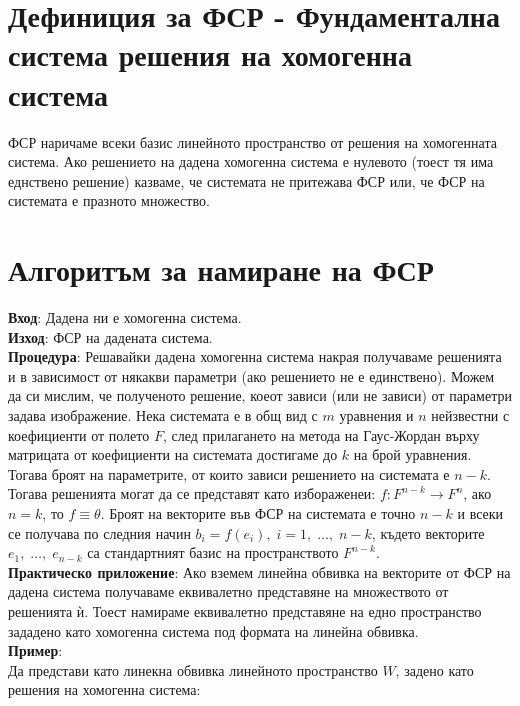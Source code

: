 \documentclass[12pt]{article}
\begin{document}
\section*{Дефиниция за ФСР - Фундаментална система решения на хомогенна система}

ФСР наричаме всеки базис линейното пространство от решения на хомогенната система.
Ако решението на дадена хомогенна система е нулевото (тоест тя има еднствено решение) казваме,
че системата не притежава ФСР или, че ФСР на системата е празното множество.

\section*{Алгоритъм за намиране на ФСР}

\textbf{Вход}: Дадена ни е хомогенна система. \\

\textbf{Изход}: ФСР на дадената система. \\

\textbf{Процедура}: Решавайки дадена хомогенна система накрая получаваме решенията и в зависимост
от някакви параметри (ако решението не е единствено). Можем да си мислим, че полученото решение,
коеот зависи (или не зависи) от параметри задава изображение. Нека системата е в общ вид с
$m$ уравнения и $n$ нейзвестни с коефициенти от полето $F$,
след прилагането на метода на Гаус-Жордан върху матрицата от коефициенти на системата достигаме
до $k$ на брой уравнения. Тогава броят на параметрите, от
които зависи решението на системата е $n - k$. Тогава решенията могат да се представят като избораженеи:
$f : F^{n - k} \to F^n$, ако $n = k$, то $f \equiv \theta$. Броят на векторите във ФСР на системата е
точно $n - k$ и всеки се получава по следния начин $b_i = f(e_i), \; i = 1, \; \dots, \; n - k$,
където векторите $e_1, \; \dots, \; e_{n - k}$ са стандартният базис на пространството $F^{n - k}$. \\

\textbf{Практическо приложение}: Ако вземем линейна обвивка на векторите от ФСР на дадена система
получаваме еквивалетно представяне на множеството от решенията ѝ. Тоест намираме еквивалетно
представяне на едно пространство зададено като хомогенна система под формата на линейна обвивка. \\

\textbf{Пример}: \\

Да представи като линекна обвивка линейното пространство $W$, задено като решения на хомогенна система: \\
\end{document}
